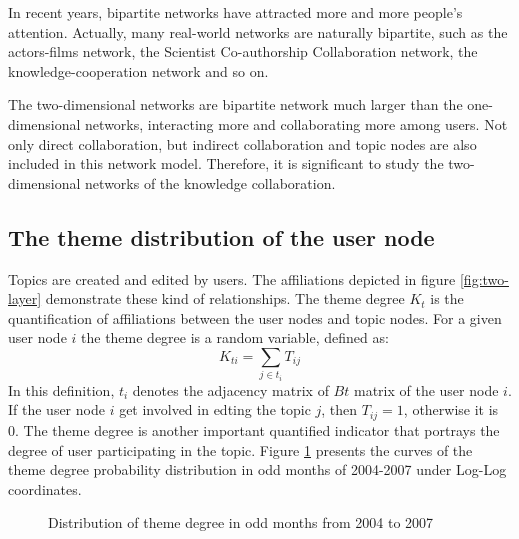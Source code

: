 \documentclass{elsarticle}
\begin{document}
In recent years, bipartite networks have attracted more and more people's attention\cite{watts1998sw,morris-2005,PhysRevE.64.026118}. Actually, many real-world networks are naturally bipartite, such as the actors-films network\cite{watts1998sw}, the Scientist Co-authorship Collaboration network\cite{morris-2005,PhysRevE.64.026118}, the knowledge-cooperation network and so on.

The two-dimensional networks are  bipartite network much larger than the one-dimensional
networks, interacting more and collaborating more among users. Not only
direct collaboration, but indirect collaboration and topic nodes are
also included in this network model. Therefore, it is  significant to study the
two-dimensional networks of the knowledge collaboration. 

\subsection{The theme distribution of the user node}
\label{sec:theme-distr-user}

Topics are created and edited by users. The affiliations depicted in
figure \ref{fig:two-layer} demonstrate these kind of relationships. 
The theme degree $K_t$ is the quantification of
affiliations between  the user nodes and topic nodes. For a given user
node $i$ the theme degree is a random variable, 
defined as:
\begin{equation}
  \label{eq:1}
  K_{ti}=\sum_{j \in t_i} T_{ij}
\end{equation}
In this definition, $t_i$ denotes the adjacency matrix of  $Bt$
matrix of the user node $i$. If the user node $i$ get involved in  edting the topic
$j$, then $T_{ij}=1$, otherwise
it is 0. The theme degree is
another important quantified indicator that portrays the degree of
user participating in the topic.  Figure \ref{fig:theme-degree} presents the curves of the theme degree
probability  distribution  in odd months of 2004-2007 under Log-Log
coordinates. 

\begin{figure}[htpb]
  \centering
  \subfigure[ ]{
     \scalebox{0.18}{\texttt{[image: 06-1]}}
   } \quad
  \subfigure[ ]{ 
       \scalebox{0.18}{\texttt{[image: 06-2]}}
   } 
  
    \subfigure[ ]{
     \scalebox{0.18}{\texttt{[image: 06-3]}}
   } \quad
  \subfigure[ ]{ 
       \scalebox{0.18}{\texttt{[image: 06-4]}}
   } 
  
    \subfigure[ ]{
     \scalebox{0.18}{\texttt{[image: 06-5]}}
   } \quad
  \subfigure[ ]{ 
       \scalebox{0.18}{\texttt{[image: 06-6]}}
   } 

    \subfigure[ ]{
     \scalebox{0.18}{\texttt{[image: 06-7]}}
   } \quad
  \subfigure[ ]{ 
       \scalebox{0.18}{\texttt{[image: 06-8]}}
   } 
   \caption{Distribution of theme degree in odd months from 2004 to
     2007}
   \label{fig:theme-degree}
\end{figure}
\end{document}
